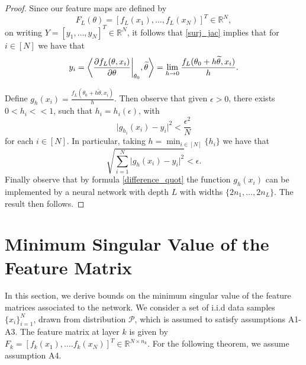 \documentclass{article}
\theoremstyle{plain}
\theoremstyle{definition}
\theoremstyle{remark}
\newcommand\R{\mathbb{R}}
\begin{document}
\begin{proof}
Since our feature maps are defined by 
\begin{equation*}
    F_L(\theta) =  [f_L(x_1),\ldots,f_L(x_N)]^T \in \R^N,
\end{equation*}
on writing 
$Y = [y_1,\ldots,y_N]^T \in \R^N$,
it follows that 
\eqref{surj_jac} implies that for $i \in [N]$ we have that
\begin{equation}\label{difference_quot}
y_i = \bigg{\langle} \frac{\partial f_L(\theta, x_i)}{\partial \theta}\bigg
{\vert}_{\theta_0}, \widetilde{\theta}\bigg{\rangle} =
\lim_{h\rightarrow 0}\frac{f_{L}(\theta_0 + 
h\widetilde{\theta}, x_i)}{h}.
\end{equation}

Define $g_h(x_i) = \frac{f_{L}(\theta_0 + 
h\widetilde{\theta}, x_i)}{h}$. Then observe that given $\epsilon > 0$, there exists $0 < h_i << 1$, such that $h_i = h_i(\epsilon)$, with
\begin{equation*}
\vert g_{h_i}(x_i) - y_i\vert^2 < \frac{\epsilon^2}{N}
\end{equation*}
for each $i \in [N]$. In particular, taking $h = \min_{i \in [N]}\{h_i\}$ we have that
\begin{equation*}
\sqrt{\sum_{i=1}^N \vert g_{h}(x_i) - y_i\vert^2} < \epsilon.
\end{equation*}
Finally observe that by formula \eqref{difference_quot}
the function $g_{h}(x_i)$ can be implemented by a neural network with depth $L$ with widths $\{2n_1,\ldots,2n_L\}$. The result then follows.
\end{proof}







\section{Minimum Singular Value of the Feature Matrix}\label{sec_feature}


In this section, we derive bounds on the minimum singular value of the feature matrices associated to the network. We consider a set of i.i.d data samples 
$\{x_i\}_{i=1}^N$, drawn from distribution $\mathcal{P}$, which is assumed to satisfy assumptions A1-A3. The 
feature matrix at layer $k$ is given by 
$F_k = [f_k(x_1),\ldots.f_k(x_N)]^T \in \R^{N\times n_k}$. For the following theorem, we assume assumption A4.
\end{document}
